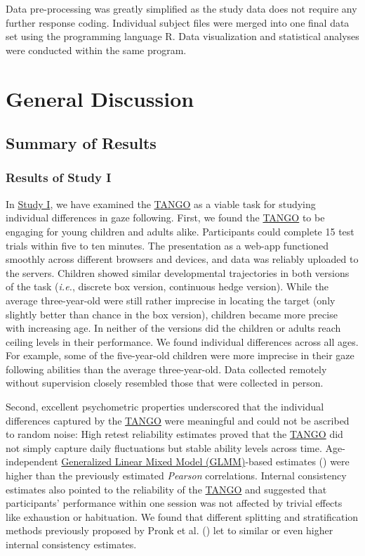 \documentclass[
]{scrbook}
\begin{document}
Data pre-processing was greatly simplified as the study data does not require any further response coding. Individual subject files were merged into one final data set using the programming language R. Data visualization and statistical analyses were conducted within the same program.

\chapter{General Discussion}\label{discussion}

\section{Summary of Results}\label{summary-of-results}

\subsection{Results of Study I}\label{resultsI}

In \hyperref[studyI]{Study I}, we have examined the \hyperref[acronyms_TANGO]{TANGO} as a viable task for studying individual differences in gaze following. First, we found the \hyperref[acronyms_TANGO]{TANGO} to be engaging for young children and adults alike. Participants could complete 15 test trials within five to ten minutes. The presentation as a web-app functioned smoothly across different browsers and devices, and data was reliably uploaded to the servers. Children showed similar developmental trajectories in both versions of the task (\emph{i.e.}, discrete box version, continuous hedge version). While the average three-year-old were still rather imprecise in locating the target (only slightly better than chance in the box version), children became more precise with increasing age. In neither of the versions did the children or adults reach ceiling levels in their performance. We found individual differences across all ages. For example, some of the five-year-old children were more imprecise in their gaze following abilities than the average three-year-old. Data collected remotely without supervision closely resembled those that were collected in person.

Second, excellent psychometric properties underscored that the individual differences captured by the \hyperref[acronyms_TANGO]{TANGO} were meaningful and could not be ascribed to random noise: High retest reliability estimates proved that the \hyperref[acronyms_TANGO]{TANGO} did not simply capture daily fluctuations but stable ability levels across time. Age-independent \hyperref[acronyms_GLMM]{Generalized Linear Mixed Model (GLMM)}-based estimates () were higher than the previously estimated \emph{Pearson} correlations. Internal consistency estimates also pointed to the reliability of the \hyperref[acronyms_TANGO]{TANGO} and suggested that participants' performance within one session was not affected by trivial effects like exhaustion or habituation. We found that different splitting and stratification methods previously proposed by Pronk et al. () let to similar or even higher internal consistency estimates.
\end{document}
